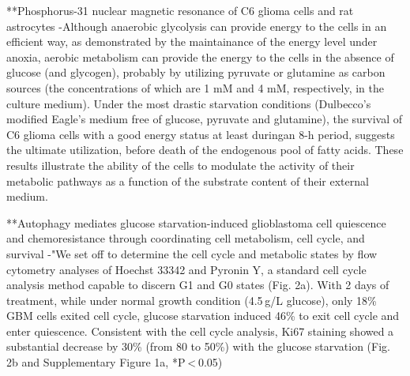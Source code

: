 \documentclass[11pt,a4paper]{article}
\begin{document}
**Phosphorus-31 nuclear magnetic resonance of C6 glioma cells and rat astrocytes
-Although anaerobic glycolysis can provide energy to the cells in an efficient way, as demonstrated by the maintainance of the energy level under anoxia, aerobic metabolism
can provide the energy to the cells in the absence of glucose (and glycogen), probably by utilizing pyruvate or glutamine as carbon sources (the concentrations of which are 1 mM and 4 mM, respectively, in the culture medium). Under the most drastic starvation conditions (Dulbecco’s modified Eagle’s medium free of glucose, pyruvate and glutamine), the survival of C6 glioma cells with a good energy status at least duringan 8-h period, suggests the ultimate utilization, before death of the endogenous pool of fatty acids. These results illustrate the ability of the cells to modulate the activity of their metabolic pathways as a function of the substrate content of their
external medium.

**Autophagy mediates glucose starvation-induced glioblastoma cell quiescence and chemoresistance through coordinating cell metabolism, cell cycle, and survival
-"We set off to determine the cell cycle and metabolic states by flow cytometry analyses of Hoechst 33342 and Pyronin Y, a standard cell cycle analysis method capable to discern G1 and G0 states (Fig. 2a). With 2 days of treatment, while under normal growth condition (4.5 g/L glucose), only 18\% GBM cells exited cell cycle, glucose starvation induced 46\% to exit cell cycle and enter quiescence. Consistent with the cell cycle analysis, Ki67 staining showed a substantial decrease by 30\% (from 80 to 50\%) with the glucose starvation (Fig. 2b and Supplementary Figure 1a, *P < 0.05)
\end{document}
